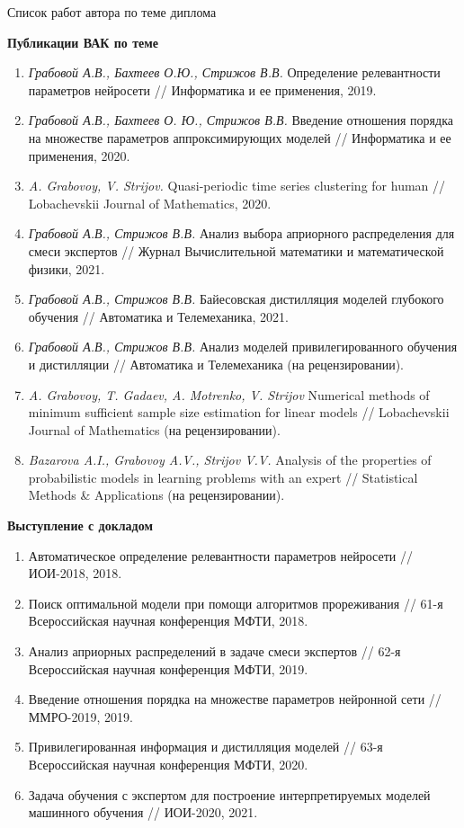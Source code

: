 \documentclass[10pt,pdf,hyperref={unicode}]{beamer}
\begin{document}
\begin{frame}{Список работ автора по теме диплома}
\justifying
{
\scriptsize
\textbf{Публикации ВАК по теме}

\begin{enumerate}
\item \textit{Грабовой А.В., Бахтеев О.Ю., Стрижов В.В.} Определение релевантности параметров нейросети // Информатика и ее применения, 2019.
\item \textit{Грабовой А.В., Бахтеев О. Ю., Стрижов В.В.} Введение отношения порядка на множестве параметров аппроксимирующих моделей // Информатика и ее применения, 2020.
\item \textit{A. Grabovoy, V. Strijov.} Quasi-periodic time series clustering for human // Lobachevskii Journal of Mathematics, 2020.
\item \textit{Грабовой А.В., Стрижов В.В.} Анализ выбора априорного распределения для смеси экспертов // Журнал Вычислительной математики и математической физики, 2021.
\item \textit{Грабовой А.В., Стрижов В.В.} Байесовская дистилляция моделей глубокого обучения // Автоматика и Телемеханика, 2021.
\item \textit{Грабовой А.В., Стрижов В.В.} Анализ моделей привилегированного обучения и дистилляции // Автоматика и Телемеханика (на рецензировании).
\item \textit{A. Grabovoy, T. Gadaev, A. Motrenko, V. Strijov} Numerical methods of minimum sufficient sample size estimation for linear models // Lobachevskii Journal of Mathematics (на рецензировании).
\item \textit{Bazarova A.I., Grabovoy A.V., Strijov V.V.} Analysis of the properties of probabilistic models in learning problems with an expert // Statistical Methods \& Applications (на рецензировании).
\end{enumerate}

\textbf{Выступление с докладом}
\begin{enumerate}
\item Автоматическое определение релевантности параметров нейросети // ИОИ-2018, 2018.
\item Поиск оптимальной модели при помощи алгоритмов прореживания // 61-я Всероссийская научная конференция МФТИ, 2018.
\item Анализ априорных распределений в задаче смеси экспертов // 62-я Всероссийская научная конференция МФТИ, 2019.
\item Введение отношения порядка на множестве параметров нейронной сети // ММРО-2019, 2019.
\item Привилегированная информация и дистилляция моделей // 63-я Всероссийская научная конференция МФТИ, 2020.
\item Задача обучения с экспертом для построение интерпретируемых моделей машинного обучения // ИОИ-2020, 2021.
\end{enumerate}
}
\end{frame}
\end{document}

